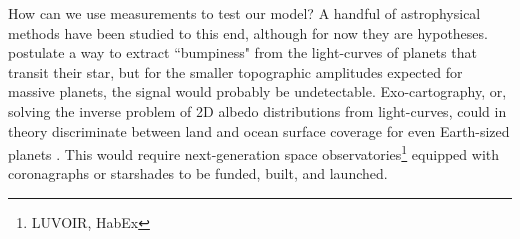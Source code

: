 How can we use measurements to test our model? A handful of astrophysical methods have been studied to this end, although for now they are hypotheses. \citet{McTier2018} postulate a way to extract ``bumpiness" from the light-curves of planets that transit their star, but for the smaller topographic amplitudes expected for massive planets, the signal would probably be undetectable. Exo-cartography, or, solving the inverse problem of 2D albedo distributions from light-curves, could in theory discriminate between land and ocean surface coverage for even Earth-sized planets \citep{Cowan2018, Farr2018, Kawahara2020, Aizawa2020}. This would require next-generation space observatories\footnote{LUVOIR, HabEx} equipped with coronagraphs or starshades to be funded, built, and launched.

